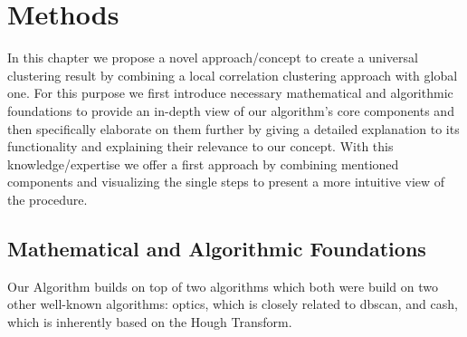 \chapter{Methods}\label{ch:Methods}
In this chapter we propose a novel approach/concept to create a universal clustering result by combining a local correlation clustering approach with global one. For this purpose we first introduce necessary mathematical and algorithmic foundations to provide an in-depth view of our algorithm's core components and then specifically elaborate on them further by giving a detailed explanation to its functionality and explaining their relevance to our concept. With this knowledge/expertise we offer a first approach by combining mentioned components and visualizing the single steps to present a more intuitive view of the procedure. 




\section{Mathematical and Algorithmic Foundations}
\label{sec:Foundations}
Our Algorithm builds on top of two algorithms which both were build on two other well-known algorithms: \gls{optics}, which is closely related to \gls{dbscan}, and \gls{cash}, which is inherently based on the Hough Transform.
